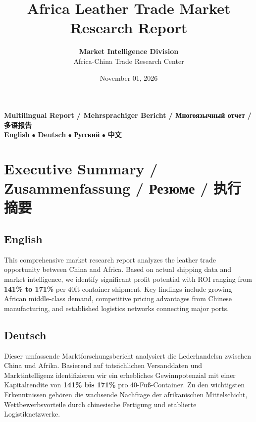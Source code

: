 \documentclass[12pt,a4paper]{article}
\title{
    \textbf{\Huge \textcolor{titleblue}{Africa Leather Trade Market Research Report}}}\\
\author{
    \textbf{Market Intelligence Division}\\
    Africa-China Trade Research Center
}
\date{November 01, 2026}
\begin{document}
\maketitle

\begin{center}
\begin{tcolorbox}[colback=sectiongray,colframe=titleblue,width=0.9\textwidth]
\textbf{\Large Multilingual Report / Mehrsprachiger Bericht / Многоязычный отчет / 多语报告}\\[0.3cm]
\textbf{English} $\bullet$ \textbf{Deutsch} $\bullet$ \textbf{Русский} $\bullet$ \textbf{中文}
\end{tcolorbox}
\end{center}

\vspace{1cm}

\tableofcontents
\newpage

\section{Executive Summary / Zusammenfassung / Резюме / 执行摘要}

\subsection*{English}
This comprehensive market research report analyzes the leather trade opportunity between China and Africa. Based on actual shipping data and market intelligence, we identify significant profit potential with ROI ranging from \textbf{141\% to 171\%} per 40ft container shipment. Key findings include growing African middle-class demand, competitive pricing advantages from Chinese manufacturing, and established logistics networks connecting major ports.

\subsection*{Deutsch}
Dieser umfassende Marktforschungsbericht analysiert die Lederhandelsn zwischen China und Afrika. Basierend auf tatsächlichen Versanddaten und Marktintelligenz identifizieren wir ein erhebliches Gewinnpotenzial mit einer Kapitalrendite von \textbf{141\% bis 171\%} pro 40-Fuß-Container. Zu den wichtigsten Erkenntnissen gehören die wachsende Nachfrage der afrikanischen Mittelschicht, Wettbewerbsvorteile durch chinesische Fertigung und etablierte Logistiknetzwerke.
\end{document}
